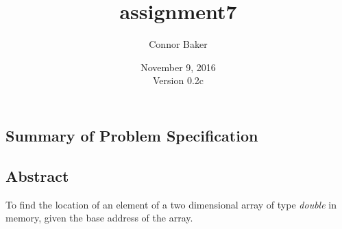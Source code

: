 \documentclass[12pt]{article}
\begin{document}
\null
\nointerlineskip 
\vfill
\let \snewpage \newpage
\let \newpage \relax
    \title{assignment7}
    \author{Connor Baker}
    \date{November 9, 2016\\Version 0.2c}
\maketitle
\let \newpage \snewpage
\vfill
\thispagestyle{empty}



\newpage %



\makeatletter
{}
\renewcommand*\l@section{\@dottedtocline{1}{0em}{1.5em}}
\makeatother
\tableofcontents

\clearpage
{}

\begin{center}
\section{Summary of Problem Specification}
\end{center}
\subsection{Abstract}
To find the location of an element of a two dimensional array of type \textit{double} in memory, given the base address of the array.
\end{document}
